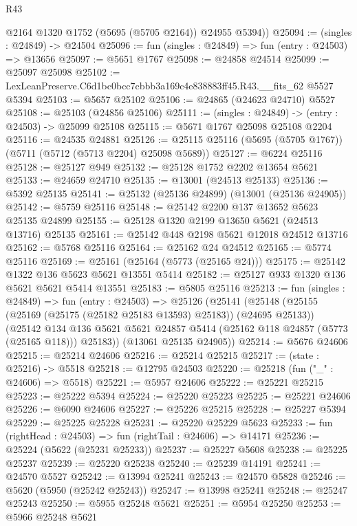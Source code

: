\begin{lexlean}{R43}
\begin{coremodule}
        @2164
        @1320
        @1752
        (@5695 (@5705 @2164))
        @24955
        @5394))
@25094 := (singles : @24849) -> @24504
@25096 := fun (singles : @24849) => fun (entry : @24503) => @13656
@25097 := @5651 @1767
@25098 := @24858 @24514
@25099 := @25097 @25098
@25102 := LexLeanPreserve.C6d1bc0bcc7cbbb3a169c4e838883ff45.R43.__fits_62 @5527 @5394
@25103 := @5657 @25102
@25106 := @24865 (@24623 @24710) @5527
@25108 := @25103 (@24856 @25106)
@25111 := (singles : @24849) -> (entry : @24503) -> @25099 @25108
@25115 := @5671 @1767 @25098 @25108 @2204
@25116 := @24535 @24881
@25126 := @25115 @25116 (@5695 (@5705 @1767)) (@5711 (@5712 (@5713 @2204) @25098 @5689))
@25127 := @6224 @25116
@25128 := @25127 @949
@25132 := @25128 @1752 @2202 @13654 @5621
@25133 := @24659 @24710
@25135 := @13001 (@24513 @25133)
@25136 := @5392 @25135
@25141 := @25132 (@25136 @24899) (@13001 (@25136 @24905))
@25142 := @5759 @25116
@25148 := @25142 @2200 @137 @13652 @5623 @25135 @24899
@25155 := @25128 @1320 @2199 @13650 @5621 (@24513 @13716) @25135
@25161 := @25142 @448 @2198 @5621 @12018 @24512 @13716
@25162 := @5768 @25116
@25164 := @25162 @24 @24512
@25165 := @5774 @25116
@25169 := @25161 (@25164 (@5773 (@25165 @24)))
@25175 := @25142 @1322 @136 @5623 @5621 @13551 @5414
@25182 := @25127 @933 @1320 @136 @5621 @5621 @5414 @13551
@25183 := @5805 @25116
@25213 := fun (singles : @24849) =>
  fun (entry : @24503) =>
  @25126
    (@25141
      (@25148
        (@25155 (@25169 (@25175 (@25182 @25183 @13593) @25183)) (@24695 @25133))
        (@25142
          @134
          @136
          @5621
          @5621
          @24857
          @5414
          (@25162 @118 @24857 (@5773 (@25165 @118)))
          @25183))
      (@13061 @25135 @24905))
@25214 := @5676 @24606
@25215 := @25214 @24606
@25216 := @25214 @25215
@25217 := (state : @25216) -> @5518
@25218 := @12795 @24503
@25220 := @25218 (fun ("_" : @24606) => @5518)
@25221 := @5957 @24606
@25222 := @25221 @25215
@25223 := @25222 @5394
@25224 := @25220 @25223
@25225 := @25221 @24606
@25226 := @6090 @24606
@25227 := @25226 @25215
@25228 := @25227 @5394
@25229 := @25225 @25228
@25231 := @25220 @25229 @5623
@25233 := fun (rightHead : @24503) => fun (rightTail : @24606) => @14171
@25236 := @25224 (@5622 (@25231 @25233))
@25237 := @25227 @5608
@25238 := @25225 @25237
@25239 := @25220 @25238
@25240 := @25239 @14191
@25241 := @24570 @5527
@25242 := @13994 @25241
@25243 := @24570 @5828
@25246 := @5620 (@5950 (@25242 @25243))
@25247 := @13998 @25241
@25248 := @25247 @25243
@25250 := @5955 @25248 @5621
@25251 := @5954 @25250
@25253 := @5966 @25248 @5621

\end{coremodule}
\end{lexlean}
